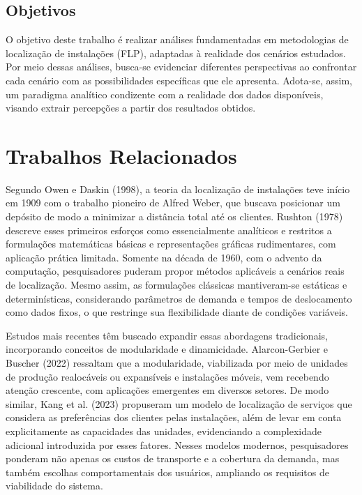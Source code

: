 \documentclass[12pt]{article}
\begin{document}
\subsection{Objetivos}

O objetivo deste trabalho é realizar análises fundamentadas em metodologias de localização de instalações (FLP), adaptadas à realidade dos cenários estudados. Por meio dessas análises, busca-se evidenciar diferentes perspectivas ao confrontar cada cenário com as possibilidades específicas que ele apresenta. Adota-se, assim, um paradigma analítico condizente com a realidade dos dados disponíveis, visando extrair percepções a partir dos resultados obtidos.

\section{Trabalhos Relacionados}

Segundo Owen e Daskin (1998), a teoria da localização de instalações teve início em 1909 com o trabalho pioneiro de Alfred Weber, que buscava posicionar um depósito de modo a minimizar a distância total até os clientes. Rushton (1978) descreve esses primeiros esforços como essencialmente analíticos e restritos a formulações matemáticas básicas e representações gráficas rudimentares, com aplicação prática limitada. Somente na década de 1960, com o advento da computação, pesquisadores puderam propor métodos aplicáveis a cenários reais de localização. Mesmo assim, as formulações clássicas mantiveram-se estáticas e determinísticas, considerando parâmetros de demanda e tempos de deslocamento como dados fixos, o que restringe sua flexibilidade diante de condições variáveis.

Estudos mais recentes têm buscado expandir essas abordagens tradicionais, incorporando conceitos de modularidade e dinamicidade. Alarcon-Gerbier e Buscher (2022) ressaltam que a modularidade, viabilizada por meio de unidades de produção realocáveis ou expansíveis e instalações móveis, vem recebendo atenção crescente, com aplicações emergentes em diversos setores. De modo similar, Kang et al. (2023) propuseram um modelo de localização de serviços que considera as preferências dos clientes pelas instalações, além de levar em conta explicitamente as capacidades das unidades, evidenciando a complexidade adicional introduzida por esses fatores. Nesses modelos modernos, pesquisadores ponderam não apenas os custos de transporte e a cobertura da demanda, mas também escolhas comportamentais dos usuários, ampliando os requisitos de viabilidade do sistema.
\end{document}
